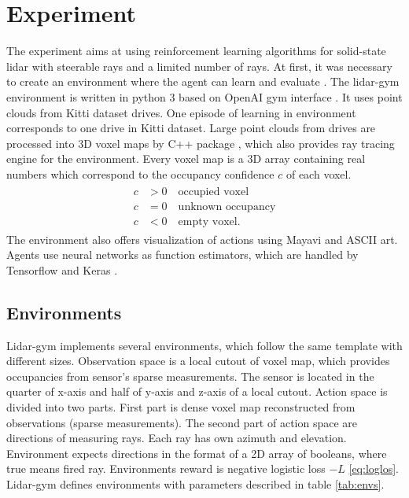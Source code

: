 \section{Experiment}
The experiment aims at using reinforcement learning algorithms for solid-state lidar with steerable rays and a limited number of rays. At first, it was necessary to create an environment where the agent can learn and evaluate \cite{rozsypalek2018}. The lidar-gym environment is written in python 3 based on OpenAI gym interface \cite{openai2016}. It uses point clouds from Kitti dataset drives\cite{geiger2013}. One episode of learning in environment corresponds to one drive in Kitti dataset. Large point clouds from drives are processed into 3D voxel maps by C++ package \cite{petricek2017}, which also provides ray tracing engine for the environment. Every voxel map is a 3D array containing real numbers which correspond to the occupancy confidence $c$ of each voxel.
\begin{align}
\begin{split}
c &> 0 \quad \text{occupied voxel} \\
c &= 0 \quad \text{unknown occupancy} \\
c &< 0 \quad \text{empty voxel.}
\end{split}
\end{align}
The environment also offers visualization of actions using Mayavi \cite{mayavi2011} and ASCII art. Agents use neural networks as function estimators, which are handled by Tensorflow \cite{tensorflow2015} and Keras \cite{keras2015}.

\subsection{Environments}
Lidar-gym implements several environments, which follow the same template with different sizes. Observation space is a local cutout of voxel map, which provides occupancies from sensor's sparse measurements. The sensor is located in the quarter of x-axis and half of y-axis and z-axis of a local cutout. Action space is divided into two parts. First part is dense voxel map reconstructed from observations (sparse measurements). The second part of action space are directions of measuring rays. Each ray has own azimuth and elevation. Environment expects directions in the format of a 2D array of booleans, where true means fired ray. Environments reward is negative logistic loss $-L$ \eqref{eq:loglos}. Lidar-gym defines environments with parameters described in table \ref{tab:envs}.

